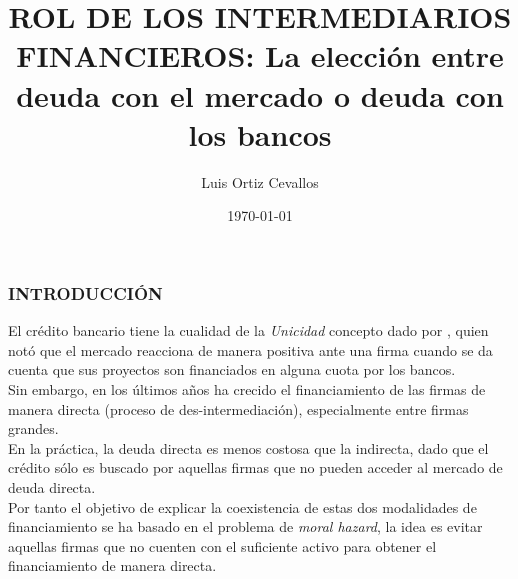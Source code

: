\documentclass[10pt, xcolor=table, x11names]{beamer}
\title[]{ROL DE LOS INTERMEDIARIOS FINANCIEROS: La elección entre deuda con el mercado o deuda con los bancos}
\author[Luis Ortiz]{Luis Ortiz Cevallos}
\institute[SECMCA]{\bf SECMCA}
\date[\today]{\footnotesize \today}
\begin{document}
\begin{frame}
\titlepage
\end{frame}




\begin{frame}
	\frametitle{{\normalsize INTRODUCCIÓN} {}}
El crédito bancario tiene la cualidad de la \textit{Unicidad} concepto dado por \cite{James1987}, quien notó que el mercado reacciona de manera positiva ante una firma cuando se da cuenta que sus proyectos son financiados en alguna cuota por los bancos.\\

Sin embargo, en los últimos años ha crecido el financiamiento de las firmas de manera directa (proceso de des-intermediación), especialmente entre firmas grandes.\\
En la práctica, la deuda directa es menos costosa que la indirecta, dado que el crédito sólo es buscado por aquellas firmas que no pueden acceder al mercado de deuda directa.\\
Por tanto el objetivo de explicar la coexistencia de estas dos modalidades de financiamiento se ha basado en el problema de \textit{moral hazard}, la idea es evitar aquellas firmas que no cuenten con el suficiente activo para obtener el financiamiento de manera directa.

\end{frame}
\end{document}
